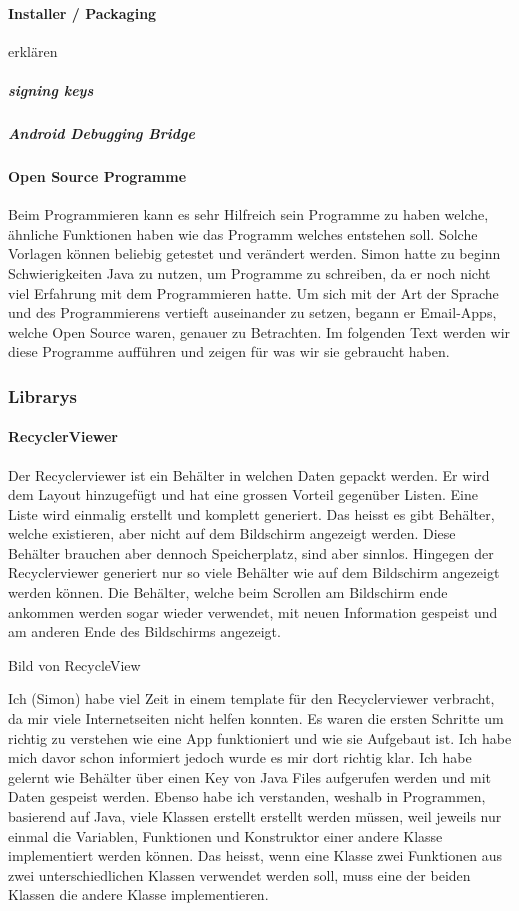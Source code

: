 \documentclass[a4paper,11pt]{article}
\begin{document}
\paragraph{Installer / Packaging}
erklären

\subparagraph{signing keys}
\subparagraph{Android Debugging Bridge}


\paragraph{Open Source Programme}

Beim Programmieren kann es sehr Hilfreich sein Programme zu haben welche, ähnliche Funktionen haben wie das Programm welches entstehen soll. 
Solche Vorlagen können beliebig getestet und verändert werden. Simon hatte zu beginn Schwierigkeiten Java zu nutzen, um Programme zu schreiben, da er noch nicht viel 
Erfahrung mit dem Programmieren hatte. Um sich mit der Art der Sprache und des Programmierens vertieft auseinander zu setzen, begann er Email-Apps, welche Open Source
waren, genauer zu Betrachten. Im folgenden Text werden wir diese Programme aufführen und zeigen für was wir sie gebraucht haben. 

\subsubsection{Librarys}

\paragraph{RecyclerViewer}

Der Recyclerviewer ist ein Behälter in welchen Daten gepackt werden. Er wird dem Layout hinzugefügt und hat eine grossen Vorteil gegenüber Listen. 
Eine Liste wird einmalig erstellt und komplett generiert. Das heisst es gibt Behälter, welche existieren, aber nicht auf dem Bildschirm angezeigt werden. 
Diese Behälter brauchen aber dennoch Speicherplatz, sind aber sinnlos. Hingegen der Recyclerviewer generiert nur so viele Behälter wie auf dem Bildschirm angezeigt werden können. 
Die Behälter, welche beim Scrollen am Bildschirm ende ankommen werden sogar wieder verwendet, mit neuen Information gespeist und am anderen Ende des Bildschirms angezeigt.

Bild von RecycleView

Ich (Simon) habe viel Zeit in einem template für den Recyclerviewer verbracht, da mir viele Internetseiten nicht helfen konnten. Es waren die ersten Schritte um 
richtig zu verstehen wie eine App funktioniert und wie sie Aufgebaut ist. Ich habe mich davor schon informiert jedoch wurde es mir dort richtig klar. Ich habe gelernt
wie Behälter über einen Key von Java Files aufgerufen werden und mit Daten gespeist werden. Ebenso habe ich verstanden, weshalb in Programmen, basierend auf Java, viele 
Klassen erstellt erstellt werden müssen, weil jeweils nur einmal die Variablen, Funktionen und Konstruktor einer andere Klasse implementiert werden können. Das heisst, 
wenn eine Klasse zwei Funktionen aus zwei unterschiedlichen Klassen verwendet werden soll, muss eine der beiden Klassen die andere Klasse implementieren. 
\end{document}
